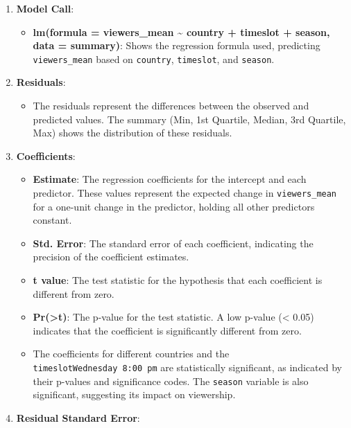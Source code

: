 \documentclass[
]{book}
\providecommand{\tightlist}{%
  \setlength{\itemsep}{0pt}\setlength{\parskip}{0pt}}
\begin{document}
\begin{enumerate}
\def\labelenumi{\arabic{enumi}.}
\tightlist
\item
  \textbf{Model Call}:

  \begin{itemize}
  \tightlist
  \item
    \textbf{lm(formula = viewers\_mean \textasciitilde{} country + timeslot + season, data = summary)}: Shows the regression formula used, predicting \texttt{viewers\_mean} based on \texttt{country}, \texttt{timeslot}, and \texttt{season}.
  \end{itemize}
\item
  \textbf{Residuals}:

  \begin{itemize}
  \tightlist
  \item
    The residuals represent the differences between the observed and predicted values. The summary (Min, 1st Quartile, Median, 3rd Quartile, Max) shows the distribution of these residuals.
  \end{itemize}
\item
  \textbf{Coefficients}:

  \begin{itemize}
  \tightlist
  \item
    \textbf{Estimate}: The regression coefficients for the intercept and each predictor. These values represent the expected change in \texttt{viewers\_mean} for a one-unit change in the predictor, holding all other predictors constant.
  \item
    \textbf{Std. Error}: The standard error of each coefficient, indicating the precision of the coefficient estimates.
  \item
    \textbf{t value}: The test statistic for the hypothesis that each coefficient is different from zero.
  \item
    \textbf{Pr(\textgreater\textbar t\textbar)}: The p-value for the test statistic. A low p-value (\textless{} 0.05) indicates that the coefficient is significantly different from zero.
  \item
    The coefficients for different countries and the \texttt{timeslotWednesday\ 8:00\ pm} are statistically significant, as indicated by their p-values and significance codes. The \texttt{season} variable is also significant, suggesting its impact on viewership.
  \end{itemize}
\item
  \textbf{Residual Standard Error}:


\end{enumerate}
\end{document}
